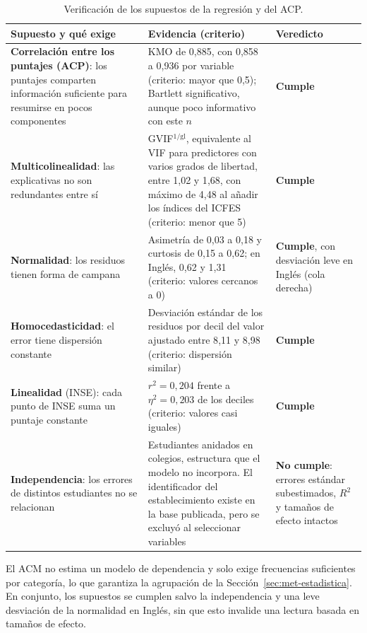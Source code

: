 \documentclass[12pt]{article}
\begin{document}
\begin{table}[H]
  \centering
  \caption{Verificación de los supuestos de la regresión y del ACP.}
  \label{tab:supuestos}
  \footnotesize{}\setlength{\tabcolsep}{4pt}
  \begin{tabular}{P{4.8cm} P{7.4cm} P{2.8cm}}
    \toprule
    \textbf{Supuesto y qué exige} & \textbf{Evidencia (criterio)} & \textbf{Veredicto} \\
    \midrule
    \textbf{Correlación entre los puntajes (ACP)}: los puntajes comparten información suficiente
    para resumirse en pocos componentes & KMO de 0{,}885, con 0{,}858 a 0{,}936 por variable (criterio: mayor que 0{,}5);
    Bartlett significativo, aunque poco informativo con este $n$ & \textbf{Cumple} \\
    \textbf{Multicolinealidad}: las explicativas no son redundantes entre sí & GVIF$^{1/\mathrm{gl}}$,
    equivalente al VIF para predictores con varios grados de libertad, entre 1{,}02 y 1{,}68, con
    máximo de 4{,}48 al añadir los índices del ICFES (criterio: menor que 5) &
    \textbf{Cumple} \\
    \textbf{Normalidad}: los residuos tienen forma de campana & Asimetría de 0{,}03 a 0{,}18 y
    curtosis de 0{,}15 a 0{,}62; en Inglés, 0{,}62 y 1{,}31 (criterio: valores cercanos a 0) &
    \textbf{Cumple}, con desviación leve en Inglés (cola derecha) \\
    \textbf{Homocedasticidad}: el error tiene dispersión constante & Desviación estándar de los
    residuos por decil del valor ajustado entre 8{,}11 y 8{,}98 (criterio: dispersión similar) &
    \textbf{Cumple} \\
    \textbf{Linealidad} (INSE): cada punto de INSE suma un puntaje constante & $r^2 = 0{,}204$ frente a
    $\eta^2 = 0{,}203$ de los deciles (criterio: valores casi iguales) & \textbf{Cumple} \\
    \textbf{Independencia}: los errores de distintos estudiantes no se relacionan & Estudiantes
    anidados en colegios, estructura que el modelo no incorpora. El identificador del
    establecimiento existe en la base publicada, pero se excluyó al seleccionar variables &
    \textbf{No cumple}: errores estándar subestimados, $R^2$ y tamaños de efecto intactos \\
    \bottomrule
  \end{tabular}
\end{table}

El ACM no estima un modelo de dependencia y solo exige frecuencias suficientes por categoría, lo que
garantiza la agrupación de la Sección~\ref{sec:met-estadistica}. En conjunto, los supuestos se cumplen
salvo la independencia y una leve desviación de la normalidad en Inglés, sin que esto invalide una
lectura basada en tamaños de efecto.
\end{document}
